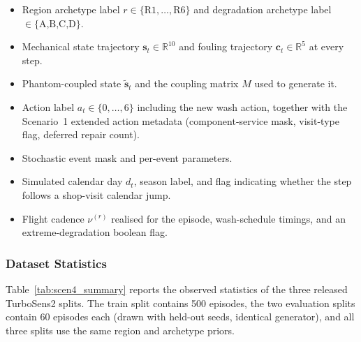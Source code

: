 \begin{itemize}
\item Region archetype label $r \in \{\text{R1},\ldots,\text{R6}\}$
      and degradation archetype label $\in \{\text{A,B,C,D}\}$.
\item Mechanical state trajectory $\mathbf{s}_t \in \mathbb{R}^{10}$
      and fouling trajectory $\mathbf{c}_t \in \mathbb{R}^{5}$
      at every step.
\item Phantom-coupled state $\tilde{\mathbf{s}}_t$ and the coupling
      matrix $M$ used to generate it.
\item Action label $a_t \in \{0,\ldots,6\}$ including the new wash
      action, together with the Scenario~1 extended action metadata
      (component-service mask, visit-type flag, deferred repair count).
\item Stochastic event mask and per-event parameters.
\item Simulated calendar day $d_t$, season label, and flag indicating
      whether the step follows a shop-visit calendar jump.
\item Flight cadence $\nu^{(r)}$ realised for the episode, wash-schedule
      timings, and an extreme-degradation boolean flag.
\end{itemize}

\subsubsection{Dataset Statistics}
\label{sec:scen4_stats}

Table~\ref{tab:scen4_summary} reports the observed statistics of the
three released TurboSens2 splits. The train split contains 500 episodes,
the two evaluation splits contain 60 episodes each (drawn with held-out
seeds, identical generator), and all three splits use the same region
and archetype priors.

